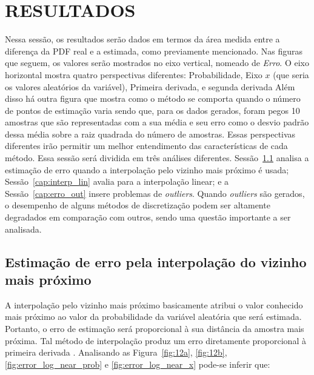 \chapter{RESULTADOS} \label{cap:resultados}
\vspace{-2cm}
Nessa sessão, os resultados serão dados em termos da área medida entre a diferença da \ac{PDF} real e a estimada, como previamente mencionado. Nas figuras que seguem, os valores serão mostrados no eixo vertical, nomeado de \textit{Erro}. O eixo horizontal mostra quatro perspectivas diferentes: Probabilidade, Eixo $ x $ (que seria os valores aleatórios da variável), Primeira derivada, e segunda derivada Além disso há outra figura que mostra como o método se comporta quando o número de pontos de estimação varia sendo que, para os dados gerados, foram pegos 10 amostras que são representadas com a sua média e seu erro como o desvio padrão dessa média sobre a raiz quadrada do número de amostras. Essas perspectivas diferentes irão permitir um melhor entendimento das características de cada método. Essa sessão será dividida em três análises diferentes. Sessão~\ref{cap:interp_neares} analisa a estimação de erro quando a interpolação pelo vizinho mais próximo é usada; Sessão~\ref{cap:interp_lin} avalia para a interpolação linear; e a Sessão~\ref{cap:erro_out} insere problemas de \textit{outliers}. Quando \textit{outliers} são gerados, o desempenho de alguns métodos de discretização podem ser altamente degradados em comparação com outros, sendo uma questão importante a ser analisada.

\section{Estimação de erro pela interpolação do vizinho mais próximo} \label{cap:interp_neares}
A interpolação pelo vizinho mais próximo basicamente atribui o valor conhecido mais próximo ao valor da probabilidade da variável aleatória que será estimada. Portanto, o erro de estimação será proporcional à sua distância da amostra mais próxima. Tal método de interpolação produz um erro diretamente proporcional à primeira derivada \cite{gurevich1966integral}. Analisando as Figura~\ref{fig:12a}, \ref{fig:12b}, \ref{fig:error_log_near_prob} e \ref{fig:error_log_near_x} pode-se inferir que: 

